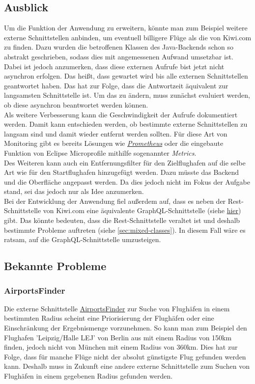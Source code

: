 \documentclass[12pt,twoside,a4paper]{article}
\begin{document}
\begin{sloppypar}
\subsection{Ausblick}
Um die Funktion der Anwendung zu erweitern, könnte man zum Beispiel weitere externe Schnittstellen anbinden, um eventuell billigere Flüge als die von Kiwi.com zu finden. Dazu wurden die betroffenen Klassen des Java-Backends schon so abstrakt geschrieben, sodass dies mit angemessenen Aufwand umsetzbar ist.\\
Dabei ist jedoch anzumerken, dass diese externen Aufrufe bist jetzt nicht asynchron erfolgen. Das heißt, dass gewartet wird bis alle externen Schnittstellen geantwortet haben. Das hat zur Folge, dass die Antwortzeit äquivalent zur langsamsten Schnittstelle ist. Um das zu ändern, muss zunächst evaluiert werden, ob diese asynchron beantwortet werden können.\\
Als weitere Verbesserung kann die Geschwindigkeit der Aufrufe dokumentiert werden. Damit kann entschieden werden, ob bestimmte externe Schnittstellen zu langsam sind und damit wieder entfernt werden sollten. Für diese Art von Monitoring gibt es bereits Lösungen wie \href{https://prometheus.io/}{\textit{Prometheus}} oder die eingebaute Funktion von Eclipse Microprofile mithilfe sogenannter \textit{Metrics}.\\
Des Weiteren kann auch ein Entfernungsfilter für den Zielflughafen auf die selbe Art wie für den Startflughafen hinzugefügt werden. Dazu müsste das Backend und die Oberfläche angepasst werden. Da dies jedoch nicht im Fokus der Aufgabe stand, sei das jedoch nur als Idee anzumerken.\\
Bei der Entwicklung der Anwendung fiel außerdem auf, dass es neben der Rest-Schnittstelle von Kiwi.com eine äquivalente GraphQL-Schnittstelle (siehe \href{https://partners.kiwi.com/presenting-tequila-revolution-travel-industry/}{hier}) gibt. Das könnte bedeuten, dass die Rest-Schnittstelle veraltet ist und deshalb bestimmte Probleme auftreten (siehe \ref{sec:mixed-classes}). In diesem Fall wäre es ratsam, auf die GraphQL-Schnittstelle umzusteigen.
\subsection{Bekannte Probleme}
\subsubsection{AirportsFinder}
Die externe Schnittstelle \href{https://rapidapi.com/cometari/api/airportsfinder}{AirportsFinder} zur Suche von Flughäfen in einem bestimmten Radius scheint eine Priorisierung der Flughäfen oder eine Einschränkung der Ergebnismenge vorzunehmen. So kann man zum Beispiel den Flughafen 'Leipzig/Halle LEJ' von Berlin aus mit einem Radius von 150km finden, jedoch nicht von München mit einem Radius von 360km. Dies hat zur Folge, dass für manche Flüge nicht der absolut günstigste Flug gefunden werden kann. Deshalb muss in Zukunft eine andere externe Schnittstelle zum Suchen von Flughäfen in einem gegebenen Radius gefunden werden.

\end{sloppypar}
\end{document}
